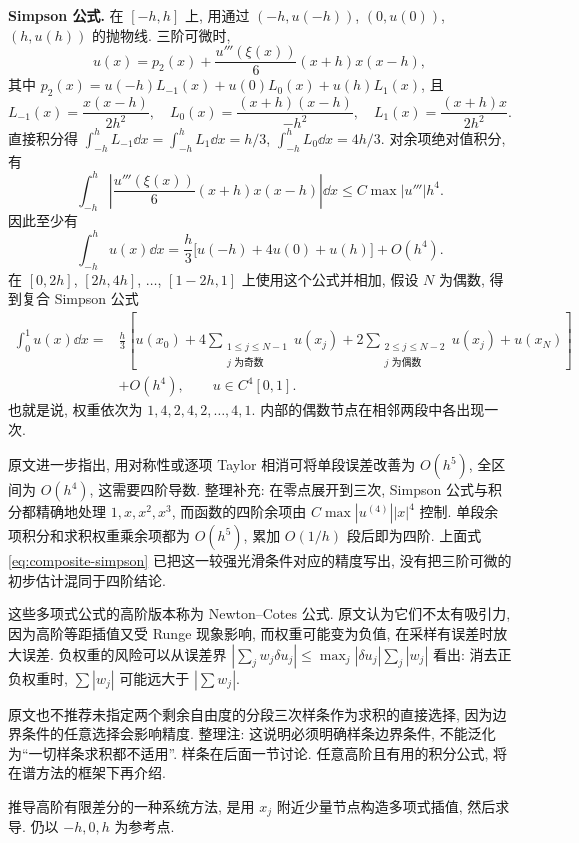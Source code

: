 \textbf{Simpson 公式.} 在 $[-h,h]$ 上, 用通过 $(-h,u(-h))$, $(0,u(0))$, $(h,u(h))$ 的抛物线. 三阶可微时,
\[
u(x)=p_2(x)+\frac{u'''(\xi(x))}{6}(x+h)x(x-h),
\]
其中 $p_2(x)=u(-h)L_{-1}(x)+u(0)L_0(x)+u(h)L_1(x)$, 且
\[
L_{-1}(x)=\frac{x(x-h)}{2h^2},\quad
L_0(x)=\frac{(x+h)(x-h)}{-h^2},\quad
L_1(x)=\frac{(x+h)x}{2h^2}.
\]
直接积分得 $\int_{-h}^{h}L_{-1}\dd x=\int_{-h}^{h}L_1\dd x=h/3$, $\int_{-h}^{h}L_0\dd x=4h/3$. 对余项绝对值积分, 有
\[
\int_{-h}^{h}\left|\frac{u'''(\xi(x))}{6}(x+h)x(x-h)\right|\dd x
\leq C\max|u'''|h^4.
\]
因此至少有
\[
\int_{-h}^{h}u(x)\dd x=\frac h3\bigl[u(-h)+4u(0)+u(h)\bigr]+O(h^4).
\]
在 $[0,2h]$, $[2h,4h]$, $\ldots$, $[1-2h,1]$ 上使用这个公式并相加, 假设 $N$ 为偶数, 得到复合 Simpson 公式
\begin{equation}\label{eq:composite-simpson}
\begin{split}
\int_0^1u(x)\dd x={}&\frac h3\left[u(x_0)+4\sum_{\substack{1\leq j\leq N-1\\j\text{ 为奇数}}}u(x_j)
+2\sum_{\substack{2\leq j\leq N-2\\j\text{ 为偶数}}}u(x_j)+u(x_N)\right]\\
&+O(h^4),\qquad u\in C^4[0,1].
\end{split}
\end{equation}
也就是说, 权重依次为 $1,4,2,4,2,\ldots,4,1$. 内部的偶数节点在相邻两段中各出现一次.

原文进一步指出, 用对称性或逐项 Taylor 相消可将单段误差改善为 $O(h^5)$, 全区间为 $O(h^4)$, 这需要四阶导数. 整理补充: 在零点展开到三次, Simpson 公式与积分都精确地处理 $1,x,x^2,x^3$, 而函数的四阶余项由 $C\max|u^{(4)}||x|^4$ 控制. 单段余项积分和求积权重乘余项都为 $O(h^5)$, 累加 $O(1/h)$ 段后即为四阶. 上面式 \eqref{eq:composite-simpson} 已把这一较强光滑条件对应的精度写出, 没有把三阶可微的初步估计混同于四阶结论.

这些多项式公式的高阶版本称为 Newton--Cotes 公式. 原文认为它们不太有吸引力, 因为高阶等距插值又受 Runge 现象影响, 而权重可能变为负值, 在采样有误差时放大误差. 负权重的风险可以从误差界 $|\sum_jw_j\delta u_j|\leq\max_j|\delta u_j|\sum_j|w_j|$ 看出: 消去正负权重时, $\sum|w_j|$ 可能远大于 $|\sum w_j|$.

原文也不推荐未指定两个剩余自由度的分段三次样条作为求积的直接选择, 因为边界条件的任意选择会影响精度. 整理注: 这说明必须明确样条边界条件, 不能泛化为“一切样条求积都不适用”. 样条在后面一节讨论. 任意高阶且有用的积分公式, 将在谱方法的框架下再介绍.


推导高阶有限差分的一种系统方法, 是用 $x_j$ 附近少量节点构造多项式插值, 然后求导. 仍以 $-h,0,h$ 为参考点.

